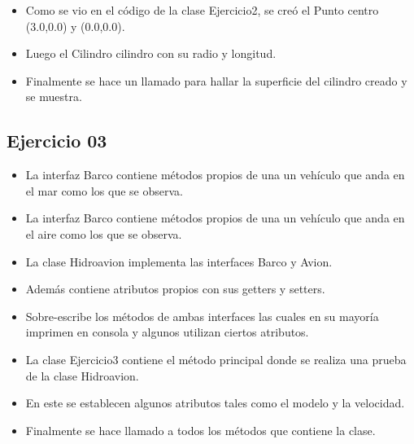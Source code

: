 \documentclass{article}
\begin{document}
    \begin{itemize}
        \item Como se vio en el código de la clase Ejercicio2, se creó el Punto centro (3.0,0.0) y (0.0,0.0).
        \item Luego el Cilindro cilindro con su radio y longitud.
        \item Finalmente se hace un llamado para hallar la superficie del cilindro creado y se muestra.
    \end{itemize}

\subsection{Ejercicio 03}
    

    \begin{itemize}
        \item La interfaz Barco contiene métodos propios de una un vehículo que anda en el mar como los que se observa.
    \end{itemize}
    
    

    \begin{itemize}
        \item La interfaz Barco contiene métodos propios de una un vehículo que anda en el aire como los que se observa.
    \end{itemize}
    
    

    \begin{itemize}
        \item La clase Hidroavion implementa las interfaces Barco y Avion.
        \item Además contiene atributos propios con sus getters y setters.
        \item Sobre-escribe los métodos de ambas interfaces las cuales en su mayoría imprimen en consola y algunos utilizan ciertos atributos.
    \end{itemize}
    


    \begin{itemize}
        \item La clase Ejercicio3 contiene el método principal donde se realiza una prueba de la clase Hidroavion.
        \item En este se establecen algunos atributos tales como el modelo y la velocidad.
        \item Finalmente se hace llamado a todos los métodos que contiene la clase.
    \end{itemize}
    
\end{document}
